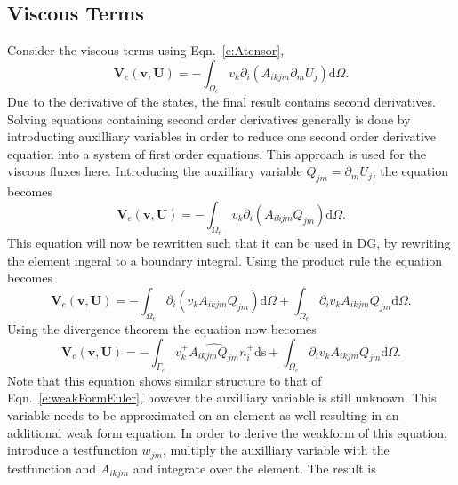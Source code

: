 \documentclass{report}
\begin{document}
\subsection{Viscous Terms}
\label{ss:ViscousTerms}
Consider the viscous terms using Eqn.~\ref{e:Atensor},
\begin{equation}
\mathbf{V}_e(\mathbf{v},\mathbf{U}) = 
- \int_{\Omega_e} v_k \partial_i ({A}_{ikjm} \partial_m U_{j}) \mathrm{d}\Omega.
\end{equation}
Due to the derivative of the states, the final result contains second derivatives. Solving equations containing second order derivatives generally is done by introducting auxilliary variables in order to reduce one second order derivative equation into a system of first order equations.
 This approach is used for the viscous fluxes here.
Introducing the auxilliary variable $Q_{jm} = \partial_m U_j$, the equation becomes
\begin{equation}
\mathbf{V}_e(\mathbf{v},\mathbf{U}) = 
- \int_{\Omega_e} v_k \partial_i ({A}_{ikjm} Q_{jm}) \mathrm{d}\Omega.
\end{equation}
This equation will now be rewritten such that it can be used in DG, by rewriting the element ingeral to a boundary integral. Using the product rule the equation becomes
\begin{equation}
\mathbf{V}_e(\mathbf{v},\mathbf{U}) = 
- \int_{\Omega_e} \partial_i (v_k {A}_{ikjm} Q_{jm}) \mathrm{d}\Omega
+ \int_{\Omega_e} \partial_i v_k {A}_{ikjm} Q_{jm} \mathrm{d}\Omega.
\end{equation}
Using the divergence theorem the equation now becomes
\begin{equation}
\label{e:ViscousWeakFormPart1}
\mathbf{V}_e(\mathbf{v},\mathbf{U}) = 
- \int_{\Gamma_e} v_k^{+} \widehat{{{A}_{ikjm} Q_{jm}}} n_i^+ \mathrm{ds}
+ \int_{\Omega_e} \partial_i v_k {A}_{ikjm} Q_{jm} \mathrm{d}\Omega.
\end{equation}
Note that this equation shows similar structure to that of Eqn.~\ref{e:weakFormEuler}, however the auxilliary variable is still unknown. This variable needs to be approximated on an element as well resulting in an additional weak form equation. In order to derive the weakform of this equation, introduce a testfunction $w_{jm}$, multiply the auxilliary variable with the testfunction and $A_{ikjm}$ and integrate over the element. The result is
\end{document}
